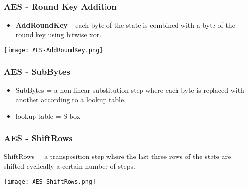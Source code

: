 \documentclass[
hyperref={pdfpagelabels=false}
,xcolor=table
]
{beamer}
\begin{document}
\begin{frame}[fragile]
  \frametitle{AES - Round Key Addition}

  \begin{itemize}
    \item \textbf{AddRoundKey} – each byte of the state is combined with a byte
      of the round key using bitwise xor.
    \end{itemize}
  
  \begin{center}
  \texttt{[image: AES-AddRoundKey.png]}
\end{center}
  
  
\end{frame}



\begin{frame}
  \frametitle{AES - SubBytes}

  \begin{itemize}
  \item SubBytes = a non-linear substitution step where each byte is
    replaced with another according to a lookup table.
  \item lookup table = S-box
  \end{itemize}

    
\end{frame}


\begin{frame}
  \frametitle{AES - ShiftRows}
  ShiftRows = a transposition step where the last three rows of the state are shifted cyclically a certain number of steps.  


  \begin{center}
    \texttt{[image: AES-ShiftRows.png]}
  \end{center}
 
\end{frame}
\end{document}
